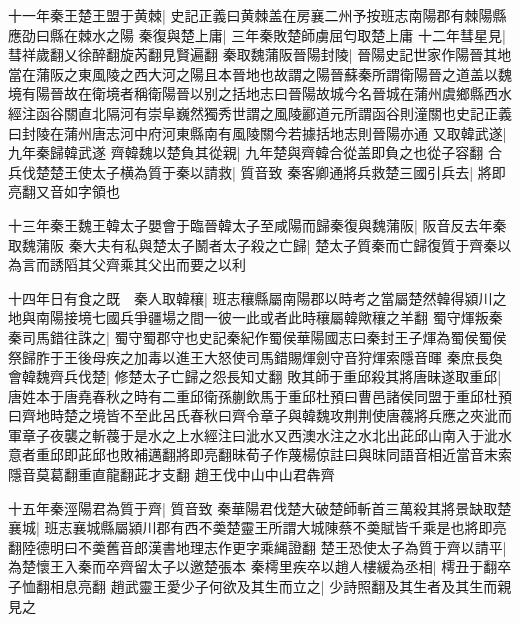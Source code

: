 十一年秦王楚王盟于黄棘|{
	史記正義曰黄棘盖在房襄二州予按班志南陽郡有棘陽縣應劭曰縣在棘水之陽
	}
秦復與楚上庸|{
	三年秦敗楚師虜屈匄取楚上庸
	}
十二年彗星見|{
	彗祥歲翻乂徐醉翻旋芮翻見賢遍翻
	}
秦取魏蒲阪晉陽封陵|{
	晉陽史記世家作陽晉其地當在蒲阪之東風陵之西大河之陽且本晉地也故謂之陽晉蘇秦所謂衛陽晉之道盖以魏境有陽晉故在衛境者稱衛陽晉以别之括地志曰晉陽故城今名晉城在蒲州虞鄉縣西水經注函谷關直北隔河有崇阜巍然獨秀世謂之風陵酈道元所謂函谷則潼關也史記正義曰封陵在蒲州唐志河中府河東縣南有風陵關今若據括地志則晉陽亦通
	}
又取韓武遂|{
	九年秦歸韓武遂
	}
齊韓魏以楚負其從親|{
	九年楚與齊韓合從盖即負之也從子容翻
	}
合兵伐楚楚王使太子横為質于秦以請救|{
	質音致
	}
秦客卿通將兵救楚三國引兵去|{
	將即亮翻又音如字領也
	}


十三年秦王魏王韓太子嬰會于臨晉韓太子至咸陽而歸秦復與魏蒲阪|{
	阪音反去年秦取魏蒲阪
	}
秦大夫有私與楚太子鬭者太子殺之亡歸|{
	楚太子質秦而亡歸復質于齊秦以為言而誘䧟其父齊乘其父出而要之以利
	}


十四年日有食之既　秦人取韓穰|{
	班志穰縣屬南陽郡以時考之當屬楚然韓得潁川之地與南陽接境七國兵爭疆場之間一彼一此或者此時穰屬韓歟穰之羊翻
	}
蜀守煇叛秦秦司馬錯往誅之|{
	蜀守蜀郡守也史記秦紀作蜀侯華陽國志曰秦封王子煇為蜀侯蜀侯祭歸胙于王後母疾之加毒以進王大怒使司馬錯賜煇劍守音狩煇索隱音暉
	}
秦庶長奐會韓魏齊兵伐楚|{
	修楚太子亡歸之怨長知丈翻
	}
敗其師于重邱殺其將唐昧遂取重邱|{
	唐姓本于唐堯春秋之時有二重邱衛孫蒯飲馬于重邱杜預曰曹邑諸侯同盟于重邱杜預曰齊地時楚之境皆不至此呂氏春秋曰齊令章子與韓魏攻荆荆使唐薎將兵應之夾泚而軍章子夜襲之斬薎于是水之上水經注曰泚水又西澳水注之水北出茈邱山南入于泚水意者重邱即茈邱也敗補邁翻將即亮翻昧荀子作蔑楊倞註曰與昩同語音相近當音末索隱音莫葛翻重直龍翻茈才支翻
	}
趙王伐中山中山君犇齊

十五年秦涇陽君為質于齊|{
	質音致
	}
秦華陽君伐楚大破楚師斬首三萬殺其將景缺取楚襄城|{
	班志襄城縣屬潁川郡有西不羮楚靈王所謂大城陳蔡不羮賦皆千乘是也將即亮翻陸德明曰不羮舊音郎漢書地理志作更字乘䋲證翻
	}
楚王恐使太子為質于齊以請平|{
	為楚懷王入秦而卒齊留太子以邀楚張本
	}
秦樗里疾卒以趙人樓緩為丞相|{
	樗丑于翻卒子恤翻相息亮翻
	}
趙武靈王愛少子何欲及其生而立之|{
	少詩照翻及其生者及其生而親見之
	}



